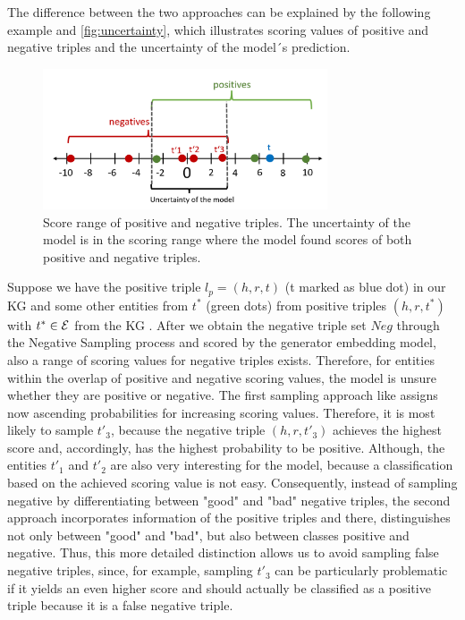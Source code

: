 The difference between the two approaches can be explained by the following example and \autoref{fig:uncertainty}, which illustrates scoring values of positive and negative triples and the uncertainty of the model´s prediction.
\begin{figure}[t]
  \centering
    \includegraphics[width=0.75\textwidth]{figures/uncertainty.PNG}
  \caption{Score range of positive and negative triples.
  The uncertainty of the model is in the scoring range where the model found scores of both positive and negative triples.}
  \label{fig:uncertainty}
\end{figure}
Suppose we have the positive triple $l_p=(h,r,t)$ (t marked as blue dot) in our KG and some other entities from  $t^*$ (green dots) from positive triples $(h,r,t^*)$ with $t^* \in \mathcal{E}$ from the \ac{KG} .
After we obtain the negative triple set $Neg$ through the Negative Sampling process and scored by the generator embedding model, also a range of scoring values for negative triples exists. 
Therefore, for entities within the overlap of positive and negative scoring values, the model is unsure whether they are positive or negative.
The first sampling approach like \kbgan assigns now ascending probabilities for increasing scoring values.
Therefore, it is most likely to sample $t'_3$, because the negative triple $(h,r,t'_3)$ achieves the highest score and, accordingly, has the highest probability to be positive.
Although, the entities $t'_1$ and $t'_2$ are also very interesting for the model, because a classification based on the achieved scoring value is not easy.
Consequently, instead of sampling negative by differentiating between "good" and "bad" negative triples, the second approach incorporates information of the positive triples and there, distinguishes not only between "good" and "bad", but also between classes positive and negative.
Thus, this more detailed distinction allows us to avoid sampling false negative triples, since, for example, sampling $t'_3$ can be particularly problematic if it yields an even higher score and should actually be classified as a positive triple because it is a false negative triple.

